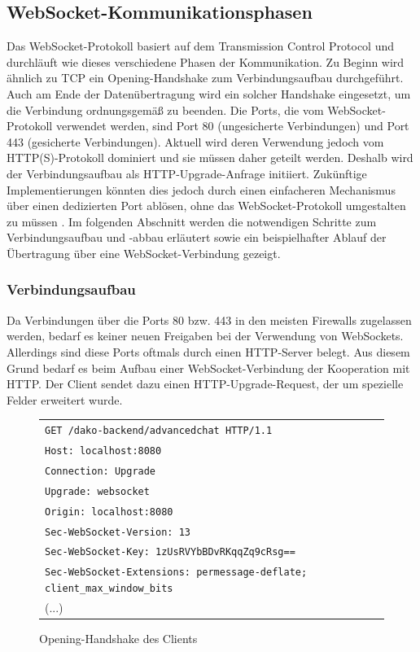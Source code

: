 \documentclass[11pt,a4paper,titlepage]{scrartcl}
\numberwithin{equation}{section}
\begin{document}
\subsection{WebSocket-Kommunikationsphasen}\label{subsec:wsLifecycle}
Das WebSocket-Protokoll basiert auf dem Transmission Control Protocol und durchläuft wie dieses verschiedene Phasen der Kommunikation. Zu Beginn wird ähnlich zu TCP ein Opening-Handshake zum Verbindungsaufbau durchgeführt. Auch am Ende der Datenübertragung wird ein solcher Handshake eingesetzt, um die Verbindung ordnungsgemäß zu beenden. Die Ports, die vom WebSocket-Protokoll verwendet werden, sind Port 80 (ungesicherte Verbindungen) und Port 443 (gesicherte Verbindungen). Aktuell wird deren Verwendung jedoch vom HTTP(S)-Protokoll dominiert und sie müssen daher geteilt werden. Deshalb wird der Verbindungsaufbau als HTTP-Upgrade-Anfrage initiiert. Zukünftige Implementierungen könnten dies jedoch durch einen einfacheren Mechanismus über einen dedizierten Port ablösen, ohne das WebSocket-Protokoll umgestalten zu müssen \autocite[3]{fette_websocket_2011}. Im folgenden Abschnitt werden die notwendigen Schritte zum Verbindungsaufbau und -abbau erläutert sowie ein beispielhafter Ablauf der Übertragung über eine WebSocket-Verbindung gezeigt.

\subsubsection{Verbindungsaufbau}\label{subsubsec:wsOpen}
Da Verbindungen über die Ports 80 bzw. 443 in den meisten Firewalls zugelassen werden, bedarf es keiner neuen Freigaben bei der Verwendung von WebSockets. Allerdings sind diese Ports oftmals durch einen HTTP-Server belegt. Aus diesem Grund bedarf es beim Aufbau einer WebSocket-Verbindung der Kooperation mit HTTP. Der Client sendet dazu einen HTTP-Upgrade-Request, der um spezielle Felder erweitert wurde.\\

\begin{figure}[ht]
	\begin{center}
		\begin{tabular}{l}
		\texttt{GET /dako-backend/advancedchat HTTP/1.1} \\
		\texttt{Host: localhost:8080} \\
		\texttt{Connection: Upgrade} \\
		\texttt{Upgrade: websocket} \\
		\texttt{Origin: localhost:8080} \\
		\texttt{Sec-WebSocket-Version: 13}\\
		\texttt{Sec-WebSocket-Key: 1zUsRVYbBDvRKqqZq9cRsg==}\\
		\texttt{Sec-WebSocket-Extensions: permessage-deflate; client\_max\_window\_bits}\\
		(...)\vspace{-5mm}
		\end{tabular}
	\end{center}
	\caption{Opening-Handshake des Clients}
	\label{fig:wsOpenHandshakeClient}
\end{figure}
\end{document}

